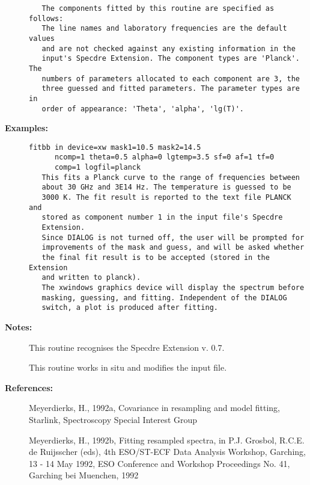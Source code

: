 \begin{description}
\begin{verbatim}
   The components fitted by this routine are specified as follows:
   The line names and laboratory frequencies are the default values
   and are not checked against any existing information in the
   input's Specdre Extension. The component types are 'Planck'. The
   numbers of parameters allocated to each component are 3, the
   three guessed and fitted parameters. The parameter types are in
   order of appearance: 'Theta', 'alpha', 'lg(T)'.

\end{verbatim}

\item [{\bf Examples:}]
\begin{verbatim}
fitbb in device=xw mask1=10.5 mask2=14.5
      ncomp=1 theta=0.5 alpha=0 lgtemp=3.5 sf=0 af=1 tf=0
      comp=1 logfil=planck
   This fits a Planck curve to the range of frequencies between
   about 30 GHz and 3E14 Hz. The temperature is guessed to be
   3000 K. The fit result is reported to the text file PLANCK and
   stored as component number 1 in the input file's Specdre
   Extension.
   Since DIALOG is not turned off, the user will be prompted for
   improvements of the mask and guess, and will be asked whether
   the final fit result is to be accepted (stored in the Extension
   and written to planck).
   The xwindows graphics device will display the spectrum before
   masking, guessing, and fitting. Independent of the DIALOG
   switch, a plot is produced after fitting.
\end{verbatim}

\item [{\bf Notes:}]
This routine recognises the Specdre Extension v. 0.7.

This routine works in situ and modifies the input file.

\item [{\bf References:}]
   Meyerdierks, H., 1992a, Covariance in resampling and model fitting,
   Starlink, Spectroscopy Special Interest Group

   Meyerdierks, H., 1992b, Fitting resampled spectra, in P.J.
   Grosbol, R.C.E. de Ruijsscher (eds), 4th ESO/ST-ECF Data Analysis
   Workshop, Garching, 13 - 14 May 1992, ESO Conference and Workshop
   Proceedings No. 41, Garching bei Muenchen, 1992

\end{description}

